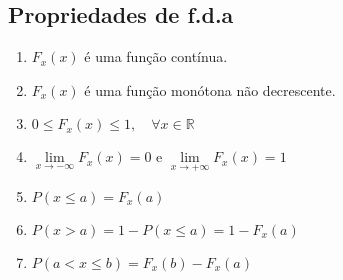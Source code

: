    \subsection{Propriedades de f.d.a}
   \begin{enumerate}[label=(\alph*)]
     \item ${F}_{x}(x)$  é uma função contínua.
     \item ${F}_{x}(x)$ é uma função monótona não decrescente. 
     \item  $0 \le {F}_{x}(x)\le 1,\quad \forall x \in \mathbb{R}$
     \item $ \lim \limits_{x \to -\infty} {F}_{x}(x)=0$ e $ \lim \limits_{x \to +\infty} {F}_{x}(x)=1$
     \item $P(x \le a) = {F}_{x}(a)$
     \item $P(x>a)=1 - P(x \le a)= 1 - {F}_{x}(a)$
     \item $P(a<x\le b)= {F}_{x}(b)- {F}_{x}(a)$
   \end{enumerate}
